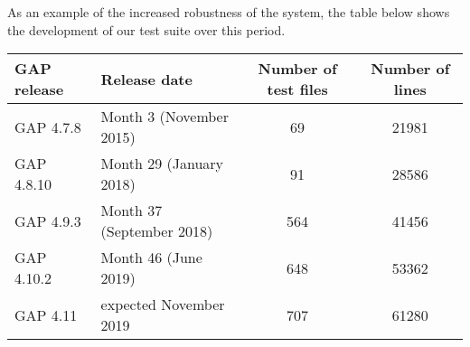 

As an example of the increased robustness of the system, the table
below shows the development of our test suite over this period.

\begin{center}
\begin{tabular}{| l | l | c | c |} 
\hline
GAP release & Release date & Number of test files & Number of lines \\
\hline GAP 4.7.8  & Month 3 (November 2015)   & 69 & 21981 \\
\hline GAP 4.8.10 & Month 29 (January 2018)   & 91 & 28586 \\
\hline GAP 4.9.3  & Month 37 (September 2018) & 564 & 41456 \\
\hline GAP 4.10.2 & Month 46 (June 2019)      & 648 & 53362 \\
\hline GAP 4.11   & expected November 2019    & 707 & 61280 \\
\hline
\end{tabular}
\end{center}

